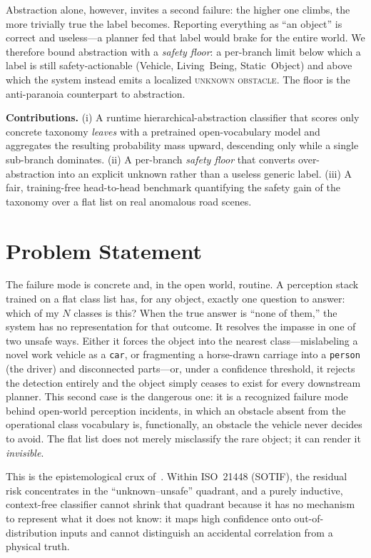 \documentclass[conference]{IEEEtran}
\begin{document}
Abstraction alone, however, invites a second failure: the higher one climbs, the
more trivially true the label becomes. Reporting everything as ``an object'' is
correct and useless---a planner fed that label would brake for the entire world.
We therefore bound abstraction with a \emph{safety floor}: a per-branch limit
below which a label is still safety-actionable (\textsf{Vehicle},
\textsf{Living~Being}, \textsf{Static~Object}) and above which the system instead
emits a localized \textsc{unknown obstacle}. The floor is the anti-paranoia
counterpart to abstraction.

\textbf{Contributions.} (i) A runtime hierarchical-abstraction classifier that
scores only concrete taxonomy \emph{leaves} with a pretrained open-vocabulary
model and aggregates the resulting probability mass upward, descending only while
a single sub-branch dominates. (ii) A per-branch \emph{safety floor} that
converts over-abstraction into an explicit unknown rather than a useless generic
label. (iii) A fair, training-free head-to-head benchmark quantifying the safety
gain of the taxonomy over a flat list on real anomalous road scenes.

\section{Problem Statement}
\label{sec:problem}

The failure mode is concrete and, in the open world, routine. A perception stack
trained on a flat class list has, for any object, exactly one question to answer:
which of my $N$ classes is this? When the true answer is ``none of them,'' the
system has no representation for that outcome. It resolves the impasse in one of
two unsafe ways. Either it forces the object into the nearest class---mislabeling
a novel work vehicle as a \texttt{car}, or fragmenting a horse-drawn carriage into
a \texttt{person} (the driver) and disconnected parts---or, under a confidence
threshold, it rejects the detection entirely and the object simply ceases to
exist for every downstream planner. This second case is the dangerous one: it is
a recognized failure mode behind open-world perception incidents, in which an
obstacle absent from the operational class vocabulary is, functionally, an
obstacle the vehicle never decides to avoid. The flat list does not merely
misclassify the rare object; it can render it \emph{invisible}.

This is the epistemological crux of~\cite{schaller_patterns}. Within ISO~21448
(SOTIF), the residual risk concentrates in the ``unknown--unsafe'' quadrant, and
a purely inductive, context-free classifier cannot shrink that quadrant because
it has no mechanism to represent what it does not know: it maps high confidence
onto out-of-distribution inputs and cannot distinguish an accidental correlation
from a physical truth.
\end{document}
